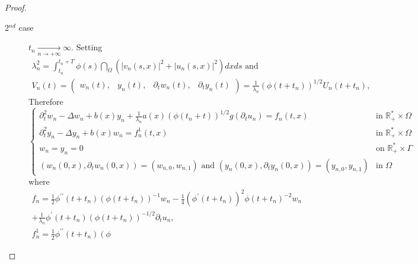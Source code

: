 \documentclass[11pt,reqno]{amsart}
\theoremstyle{plain}
\numberwithin{equation}{section}
\numberwithin{equation}{section}
\begin{document}
\begin{proof}
\begin{description}
\item[2$^{nd}$ case] $t_{n}\underset{n\rightarrow +\infty }{\longrightarrow }%
\infty .$ Setting%
\begin{equation*}
\begin{array}{l}
\lambda _{n}^{2}=\int_{t_{n}}^{t_{n}+T}\phi \left( s\right) \dint_{\Omega
}\left( \left\vert v_{n}\left( s,x\right) \right\vert ^{2}+\left\vert
u_{n}\left( s,x\right) \right\vert ^{2}\right) dxds\text{ \ and } \\ 
V_{n}\left( t\right) =\left( 
\begin{array}{cccc}
w_{n}\left( t\right) , & y_{n}\left( t\right) , & \partial _{t}w_{n}\left(
t\right) , & \partial _{t}y_{n}\left( t\right)%
\end{array}%
\right) =\frac{1}{\lambda _{n}}\left( \phi \left( t+t_{n}\right) \right)
^{1/2}U_{n}\left( t+t_{n}\right) ,%
\end{array}%
\end{equation*}%
Therefore%
\begin{equation*}
\left\{ 
\begin{array}{ll}
\partial _{t}^{2}w_{n}-\Delta w_{n}+b(x)y_{n}+\frac{1}{\lambda _{n}}%
a(x)\left( \phi \left( t_{n}+t\right) \right) ^{1/2}g\left( \partial
_{t}u_{n}\right) =f_{n}\left( t,x\right) & \text{in }\mathbb{R}_{+}^{\ast
}\times \Omega \\ 
\partial _{t}^{2}y_{n}-\Delta y_{n}+b(x)w_{n}=f_{n}^{1}\left( t,x\right) & 
\text{in }\mathbb{R}_{+}^{\ast }\times \Omega \\ 
w_{n}=y_{n}=0 & \text{on }\mathbb{R}_{+}^{\ast }\times \Gamma \\ 
\left( w_{n}\left( 0,x\right) ,\partial _{t}w_{n}\left( 0,x\right) \right)
=\left( w_{n,0},w_{n,1}\right) \text{ and }\left( y_{n}\left( 0,x\right)
,\partial _{t}y_{n}\left( 0,x\right) \right) =\left( y_{n,0},y_{n,1}\right)
& \text{in }\Omega%
\end{array}%
\right.
\end{equation*}%
where%
\begin{equation*}
\begin{array}{l}
f_{n}=\frac{1}{2}\phi ^{\prime \prime }\left( t+t_{n}\right) \left( \phi
\left( t+t_{n}\right) \right) ^{-1}w_{n}-\frac{1}{4}\left( \phi ^{\prime
}\left( t+t_{n}\right) \right) ^{2}\phi \left( t+t_{n}\right) ^{-2}w_{n} \\ 
+\frac{1}{\lambda _{n}}\phi ^{\prime }\left( t+t_{n}\right) \left( \phi
\left( t+t_{n}\right) \right) ^{-1/2}\partial _{t}u_{n}, \\ 
f_{n}^{1}=\frac{1}{2}\phi ^{\prime \prime }\left( t+t_{n}\right) \left( \phi

\end{array}
\end{equation*}
\end{description}
\end{proof}
\end{document}
